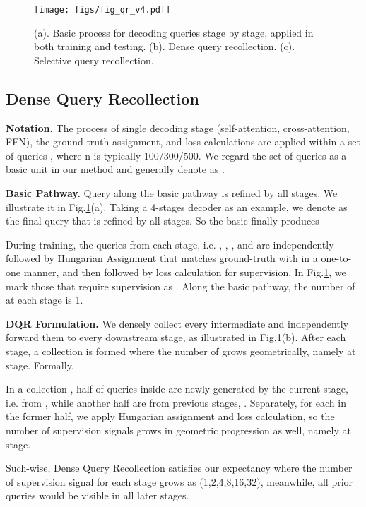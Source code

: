 \documentclass[10pt,twocolumn,letterpaper]{article}
\begin{document}
\begin{figure}
    \centering
    \texttt{[image: figs/fig\_qr\_v4.pdf]}
    \caption{(a). Basic process for decoding queries stage by stage, applied in both training and testing. (b). Dense query recollection. (c). Selective query recollection.}
        \label{fig:qr}
\end{figure}

\subsection{Dense Query Recollection}
\textbf{Notation.} The process of single decoding stage (self-attention, cross-attention, FFN), the ground-truth assignment, and loss calculations are applied within a set of queries , where n is typically 100/300/500. We regard the set of queries as a basic unit in our method and generally denote as .

\textbf{Basic Pathway.} Query along the basic pathway is refined by all stages. We illustrate it in Fig.\ref{fig:qr}(a). Taking a 4-stages decoder as an example, we denote  as the final query that is refined by all stages.  So the basic  finally produces



During training, the queries from each stage, i.e. , , , and  are independently followed by Hungarian Assignment that matches ground-truth with  in a one-to-one manner, and then followed by loss calculation for supervision. In Fig.\ref{fig:qr}, we mark those  that require supervision as . Along the basic pathway, the number of  at each stage is 1. 


\textbf{DQR Formulation.} We densely collect every intermediate  and independently forward them to every downstream stage, as illustrated in Fig.\ref{fig:qr}(b). After each stage, a collection  is formed where the number of  grows geometrically, namely  at  stage. Formally,




In a collection , half of queries inside are newly generated by the current stage, i.e. from , while another half are from previous stages, . Separately, for each  in the former half, we apply Hungarian assignment and loss calculation, so the number of supervision signals grows in geometric progression as well, namely  at  stage.

Such-wise, Dense Query Recollection satisfies our expectancy where the number of supervision signal for each stage grows as (1,2,4,8,16,32), meanwhile, all prior queries would be visible in all later stages.
\end{document}
